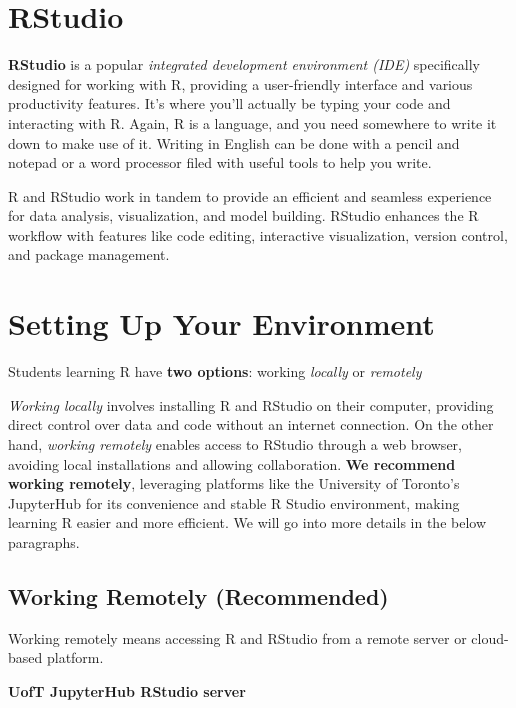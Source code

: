 \documentclass[
]{book}
\begin{document}
\hypertarget{rstudio}{%
\section{RStudio}\label{rstudio}}

\textbf{RStudio} is a popular \emph{integrated development environment (IDE)} specifically designed for working with R, providing a user-friendly interface and various productivity features. It's where you'll actually be typing your code and interacting with R. Again, R is a language, and you need somewhere to write it down to make use of it. Writing in English can be done with a pencil and notepad or a word processor filed with useful tools to help you write.

R and RStudio work in tandem to provide an efficient and seamless experience for data analysis, visualization, and model building. RStudio enhances the R workflow with features like code editing, interactive visualization, version control, and package management.

\hypertarget{setting-up-your-environment}{%
\section{Setting Up Your Environment}\label{setting-up-your-environment}}

Students learning R have \textbf{two options}: working \emph{locally} or \emph{remotely}

\emph{Working locally} involves installing R and RStudio on their computer, providing direct control over data and code without an internet connection. On the other hand, \emph{working remotely} enables access to RStudio through a web browser, avoiding local installations and allowing collaboration. \textbf{We recommend working remotely}, leveraging platforms like the University of Toronto's JupyterHub for its convenience and stable R Studio environment, making learning R easier and more efficient. We will go into more details in the below paragraphs.

\hypertarget{working-remotely-recommended}{%
\subsection{Working Remotely (Recommended)}\label{working-remotely-recommended}}

Working remotely means accessing R and RStudio from a remote server or cloud-based platform.

\textbf{UofT JupyterHub RStudio server}
\end{document}
